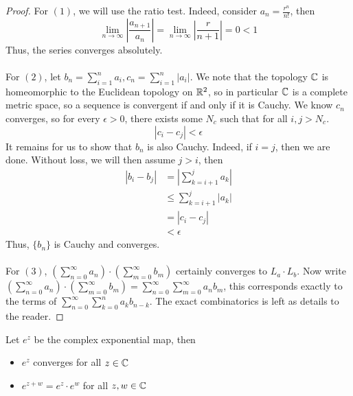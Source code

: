 \begin{proof}
For $(1)$, we will use the ratio test. Indeed, consider $a_n = \frac{r^n}{n!}$, then
\[\lim_{n \to \infty} |\frac{a_{n+1}}{a_n}| = \lim_{n \to \infty} |\frac{r}{n + 1}| = 0 < 1\]
Thus, the series converges absolutely.\\\\
For $(2)$, let $b_n = \sum_{i = 1}^n a_i, c_n = \sum_{i = 1}^n |a_i|$. We note that the topology $\mathbb{C}$ is homeomorphic to the Euclidean topology on $\mathbb{R}^2$, so in particular $\mathbb{C}$ is a complete metric space, so a sequence is convergent if and only if it is Cauchy. We know $c_n$ converges, so for every $\epsilon > 0$, there exists some $N_c$ such that for all $i, j > N_c$.
\[|c_i - c_j| < \epsilon\]
It remains for us to show that $b_n$ is also Cauchy. Indeed, if $i = j$, then we are done. Without loss, we will then assume $j > i$, then
\begin{align*}
    |b_i - b_j| &= |\sum_{k = i + 1}^j a_k|\\
    &\leq \sum_{k = i + 1}^j |a_k| \tag*{Triangle's Inequality}\\
    &= |c_i - c_j|\\
    &< \epsilon
\end{align*}
Thus, $\{b_n\}$ is Cauchy and converges.\\\\
For $(3)$, $(\sum_{n = 0}^\infty a_n) \cdot (\sum_{m = 0}^\infty b_m)$ certainly converges to $L_a \cdot L_b$. Now write $(\sum_{n = 0}^\infty a_n) \cdot (\sum_{m = 0}^\infty b_m) = \sum_{n = 0}^\infty \sum_{m = 0}^\infty a_n b_m$, this corresponds exactly to the terms of $\sum_{n = 0}^\infty \sum_{k = 0}^n a_k b_{n - k}$. The exact combinatorics is left as details to the reader.
\end{proof}

\begin{corollary}
Let $e^z$ be the complex exponential map, then
\begin{itemize}
    \item $e^z$ converges for all $z \in \mathbb{C}$
    \item $e^{z + w} = e^z \cdot e^w$ for all $z, w \in \mathbb{C}$
\end{itemize}
\end{corollary}

